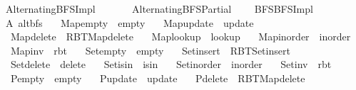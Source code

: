 %
\begin{isabellebody}%
%
%
\isadelimtheory
%
\endisadelimtheory
%
\isatagtheory
{}\isamarkupfalse%
\ Alternating{\isacharunderscore}{\kern0pt}BFS{\isacharunderscore}{\kern0pt}Impl\isanewline
\ \ \isanewline
\ \ \ \ Alternating{\isacharunderscore}{\kern0pt}BFS{\isacharunderscore}{\kern0pt}Partial\isanewline
\ \ \ \ {\isachardoublequoteopen}{\isachardot}{\kern0pt}{\isachardot}{\kern0pt}{\isacharslash}{\kern0pt}BFS{\isacharslash}{\kern0pt}BFS{\isacharunderscore}{\kern0pt}Impl{\isachardoublequoteclose}\isanewline
{}%
\endisatagtheory
{\isafoldtheory}%
%
\isadelimtheory
\isanewline
%
\endisadelimtheory
\isanewline
{}\isamarkupfalse%
\ A{\isacharcolon}{\kern0pt}\ alt{\isacharunderscore}{\kern0pt}bfs\ \isanewline
\ \ Map{\isacharunderscore}{\kern0pt}empty\ {\isacharequal}{\kern0pt}\ empty\ \isanewline
\ \ Map{\isacharunderscore}{\kern0pt}update\ {\isacharequal}{\kern0pt}\ update\ \isanewline
\ \ Map{\isacharunderscore}{\kern0pt}delete\ {\isacharequal}{\kern0pt}\ RBT{\isacharunderscore}{\kern0pt}Map{\isachardot}{\kern0pt}delete\ \isanewline
\ \ Map{\isacharunderscore}{\kern0pt}lookup\ {\isacharequal}{\kern0pt}\ lookup\ \isanewline
\ \ Map{\isacharunderscore}{\kern0pt}inorder\ {\isacharequal}{\kern0pt}\ inorder\ \isanewline
\ \ Map{\isacharunderscore}{\kern0pt}inv\ {\isacharequal}{\kern0pt}\ rbt\ \isanewline
\ \ Set{\isacharunderscore}{\kern0pt}empty\ {\isacharequal}{\kern0pt}\ empty\ \isanewline
\ \ Set{\isacharunderscore}{\kern0pt}insert\ {\isacharequal}{\kern0pt}\ RBT{\isacharunderscore}{\kern0pt}Set{\isachardot}{\kern0pt}insert\ \isanewline
\ \ Set{\isacharunderscore}{\kern0pt}delete\ {\isacharequal}{\kern0pt}\ delete\ \isanewline
\ \ Set{\isacharunderscore}{\kern0pt}isin\ {\isacharequal}{\kern0pt}\ isin\ \isanewline
\ \ Set{\isacharunderscore}{\kern0pt}inorder\ {\isacharequal}{\kern0pt}\ inorder\ \isanewline
\ \ Set{\isacharunderscore}{\kern0pt}inv\ {\isacharequal}{\kern0pt}\ rbt\ \isanewline
\ \ P{\isacharunderscore}{\kern0pt}empty\ {\isacharequal}{\kern0pt}\ empty\ \isanewline
\ \ P{\isacharunderscore}{\kern0pt}update\ {\isacharequal}{\kern0pt}\ update\ \isanewline
\ \ P{\isacharunderscore}{\kern0pt}delete\ {\isacharequal}{\kern0pt}\ RBT{\isacharunderscore}{\kern0pt}Map{\isachardot}{\kern0pt}delete\ \isanewline

\end{isabellebody}
